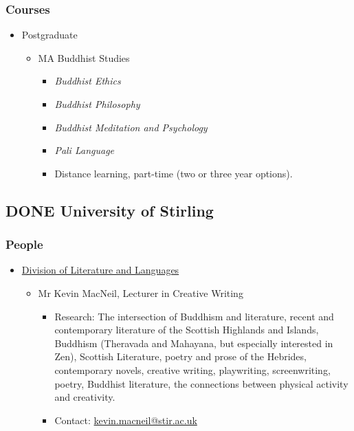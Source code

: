 \documentclass[11pt]{article}
\begin{document}
\subsubsection*{Courses}
\label{sec:orge8bab67}
\begin{itemize}
\item Postgraduate
\label{sec:org064ca26}
\begin{itemize}
\item MA Buddhist Studies\\
\begin{itemize}
\item \emph{Buddhist Ethics}\\
\item \emph{Buddhist Philosophy}\\
\item \emph{Buddhist Meditation and Psychology}\\
\item \emph{Pali Language}\\
\item Distance learning, part-time (two or three year options).\\
\end{itemize}
\end{itemize}
\end{itemize}
\subsection*{{\bfseries\sffamily DONE} University of Stirling}
\label{sec:orgd54d752}
\subsubsection*{People}
\label{sec:orgbdf9ee6}
\begin{itemize}
\item \href{https://www.stir.ac.uk/about/faculties/arts-humanities/literature-and-languages/}{Division of Literature and Languages}
\label{sec:orgac06e02}
\begin{itemize}
\item Mr Kevin MacNeil, Lecturer in Creative Writing
\label{sec:org7f2bbd7}
\begin{itemize}
\item Research: The intersection of Buddhism and literature, recent and contemporary literature of the Scottish Highlands and Islands, Buddhism (Theravada and Mahayana, but especially interested in Zen), Scottish Literature, poetry and prose of the Hebrides, contemporary novels, creative writing, playwriting, screenwriting, poetry, Buddhist literature, the connections between physical activity and creativity.\\
\item Contact: \href{mailto:kevin.macneil@stir.ac.uk}{kevin.macneil@stir.ac.uk}\\
\end{itemize}
\end{itemize}
\end{itemize}
\end{document}
